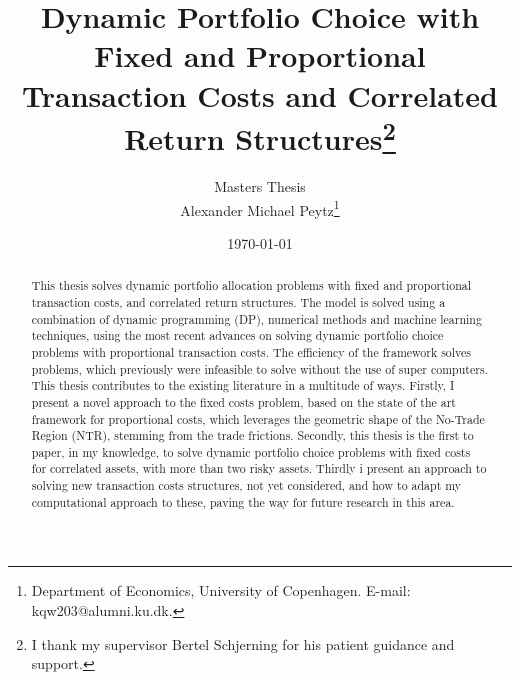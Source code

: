 \documentclass[11pt]{article}
\author{Masters Thesis\\
	Alexander Michael Peytz\footnote{Department of Economics, University of Copenhagen. E-mail: kqw203@alumni.ku.dk.}}
\title{Dynamic Portfolio Choice with Fixed and Proportional Transaction Costs and Correlated Return Structures\footnote{I thank my supervisor Bertel Schjerning for his patient guidance and support.}}
\date{\today}
\begin{document}
% 


\clearpage
\setcounter{page}{1}

\maketitle
\renewcommand*{\thefootnote}{\fnsymbol{footnote}}

\begin{abstract}
\noindent This thesis solves dynamic portfolio allocation problems with fixed and proportional transaction costs,
and correlated return structures. The model is solved using a combination of dynamic programming (DP), numerical methods and machine learning techniques,
using the most recent advances on solving dynamic portfolio choice problems with proportional transaction costs.
The efficiency of the framework solves problems, which previously were infeasible to solve without the use of super computers.
This thesis contributes to the existing literature in a multitude of ways. Firstly,
I present a novel approach to the fixed costs problem, based on the state of the art framework for proportional costs,
which leverages the geometric shape of the No-Trade Region (NTR), stemming from the trade frictions.
Secondly, this thesis is the first to paper, in my knowledge, to solve dynamic portfolio choice problems with fixed costs for correlated assets, with more than two risky assets.
Thirdly i present an approach to solving new transaction costs structures, not yet considered, and how to adapt my computational approach to these,
paving the way for future research in this area.
\end{abstract}

\newpage
\begingroup 
  \hypersetup{linkcolor=black}
  \tableofcontents
  \newpage
  \listoffigures
  \listoftables
  \printacronyms[sort=true, template=tabular, display=used]  
\endgroup
\newpage

\clearpage
{}
\renewcommand*{\thefootnote}{\arabic{footnote}}
\setcounter{footnote}{0}
\end{document}
